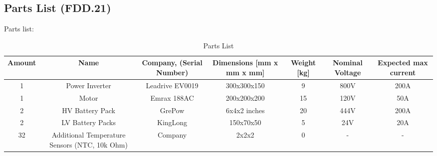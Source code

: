 \subsection{Parts List (FDD.21)}
Parts list:
\begin{table}[h]
    \centering
    \caption{Parts List}
    \begin{tabular}{|c|c|c|c|c|c|c|}
        \hline
        \textbf{Amount} & \textbf{Name} & \textbf{Company, (Serial Number)} & \textbf{Dimensions [mm x mm x mm]} & \textbf{Weight [kg]} & \textbf{Nominal Voltage} & \textbf{Expected max current} \\
        \hline
        1 & Power Inverter & Leadrive EV0019 & 300x300x150 & 9 & 800V & 200A \\
        \hline
        1 & Motor & Emrax 188AC & 200x200x200 & 15 & 120V & 50A \\
        \hline
        2 & HV Battery Pack & GrePow & 6x4x2 inches & 20 & 444V & 200A \\
        \hline
        2 & LV Battery Packs & KingLong & 150x70x50 & 5 & 24V & 20A \\
        \hline
        32 & Additional Temperature Sensors (NTC, 10k Ohm) & Company & 2x2x2 & 0 & - & - \\
    \end{tabular}
\end{table}


\newpage
\newpage